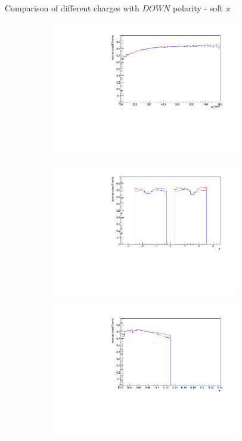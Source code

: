 \documentclass[11pt]{beamer}
\begin{document}
\begin{frame}{Comparison of different charges with $DOWN$ polarity - soft $\pi$}
\begin{figure}
\begin{subfigure}{0.45\textwidth}
\includegraphics[width=0.9\textwidth]{third/down_pdf/combined/h_pt_reco_SPi.pdf}
\end{subfigure}
\begin{subfigure}{0.45\textwidth}
\includegraphics[width=0.9\textwidth]{third/down_pdf/combined/h_phi_reco_SPi.pdf}
\end{subfigure}
\begin{subfigure}{0.45\textwidth}
\includegraphics[width=0.9\textwidth]{third/down_pdf/combined/h_theta_reco_SPi.pdf}

\end{subfigure}
\end{figure}
\end{frame}
\end{document}
